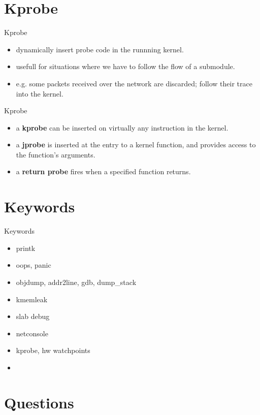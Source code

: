 \documentclass{workshop}
\begin{document}
\section{Kprobe}
\begin{frame}{Kprobe}
\begin{itemize}
\item dynamically insert probe code in the runnning kernel.
\item usefull for situations where we have to follow the flow of a submodule.
\item e.g. some packets received over the network are discarded; follow their
trace into the kernel.
\end{itemize}
\end{frame}

\begin{frame}{Kprobe}
\begin{itemize}
\item  a \textbf{kprobe} can be inserted on virtually any instruction in the kernel.
\item a \textbf{jprobe} is inserted at the entry to a kernel function, and provides access to the
function's arguments.
\item a \textbf{return probe} fires when a specified function returns.
\end{itemize}
\end{frame}

\section{Keywords}
\begin{frame}{Keywords}
      \begin{itemize}
        \item printk
	\item oops, panic
	\item objdump, addr2line, gdb, dump_stack
	\item kmemleak
	\item slab debug
	\item netconsole
	\item kprobe, hw watchpoints
	\item 
      \end{itemize}
\end{frame}


\section{Questions}
\end{document}
